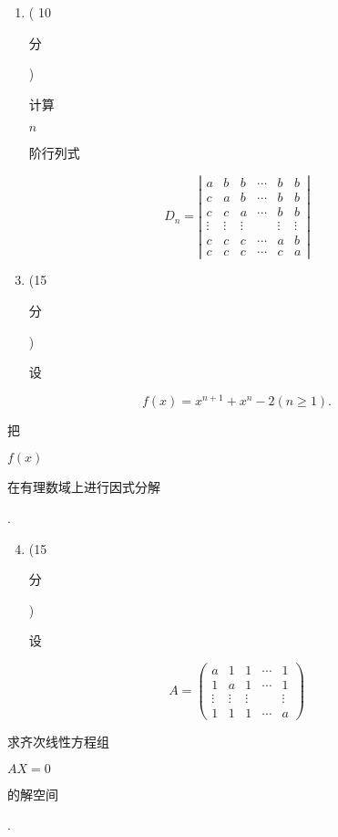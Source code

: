 \documentclass[10pt]{article}
\begin{document}
\begin{enumerate}
  \item ( 10 \begin{CJK}{UTF8}{mj}分\end{CJK}) \begin{CJK}{UTF8}{mj}计算\end{CJK} $n$ \begin{CJK}{UTF8}{mj}阶行列式\end{CJK}
\end{enumerate}
$$
D_{n}=\left|\begin{array}{cccccc}
a & b & b & \cdots & b & b \\
c & a & b & \cdots & b & b \\
c & c & a & \cdots & b & b \\
\vdots & \vdots & \vdots & & \vdots & \vdots \\
c & c & c & \cdots & a & b \\
c & c & c & \cdots & c & a
\end{array}\right|
$$

\begin{enumerate}
  \setcounter{enumi}{2}
  \item (15 \begin{CJK}{UTF8}{mj}分\end{CJK}) \begin{CJK}{UTF8}{mj}设\end{CJK}
\end{enumerate}
$$
f(x)=x^{n+1}+x^{n}-2(n \geqslant 1) .
$$
\begin{CJK}{UTF8}{mj}把\end{CJK} $f(x)$ \begin{CJK}{UTF8}{mj}在有理数域上进行因式分解\end{CJK}.

\begin{enumerate}
  \setcounter{enumi}{3}
  \item (15 \begin{CJK}{UTF8}{mj}分\end{CJK}) \begin{CJK}{UTF8}{mj}设\end{CJK}
\end{enumerate}
$$
A=\left(\begin{array}{ccccc}
a & 1 & 1 & \cdots & 1 \\
1 & a & 1 & \cdots & 1 \\
\vdots & \vdots & \vdots & & \vdots \\
1 & 1 & 1 & \cdots & a
\end{array}\right)
$$
\begin{CJK}{UTF8}{mj}求齐次线性方程组\end{CJK} $A X=0$ \begin{CJK}{UTF8}{mj}的解空间\end{CJK}.
\end{document}

